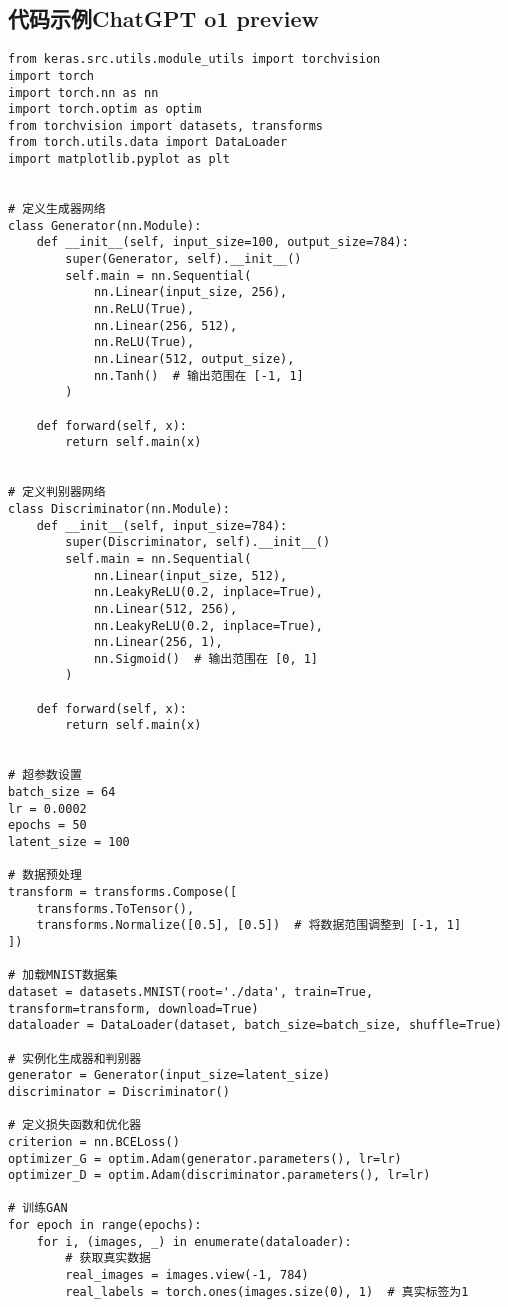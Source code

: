 \subsection*{代码示例ChatGPT o1 preview}
\begin{lstlisting}
from keras.src.utils.module_utils import torchvision
import torch
import torch.nn as nn
import torch.optim as optim
from torchvision import datasets, transforms
from torch.utils.data import DataLoader
import matplotlib.pyplot as plt


# 定义生成器网络
class Generator(nn.Module):
    def __init__(self, input_size=100, output_size=784):
        super(Generator, self).__init__()
        self.main = nn.Sequential(
            nn.Linear(input_size, 256),
            nn.ReLU(True),
            nn.Linear(256, 512),
            nn.ReLU(True),
            nn.Linear(512, output_size),
            nn.Tanh()  # 输出范围在 [-1, 1]
        )

    def forward(self, x):
        return self.main(x)


# 定义判别器网络
class Discriminator(nn.Module):
    def __init__(self, input_size=784):
        super(Discriminator, self).__init__()
        self.main = nn.Sequential(
            nn.Linear(input_size, 512),
            nn.LeakyReLU(0.2, inplace=True),
            nn.Linear(512, 256),
            nn.LeakyReLU(0.2, inplace=True),
            nn.Linear(256, 1),
            nn.Sigmoid()  # 输出范围在 [0, 1]
        )

    def forward(self, x):
        return self.main(x)


# 超参数设置
batch_size = 64
lr = 0.0002
epochs = 50
latent_size = 100

# 数据预处理
transform = transforms.Compose([
    transforms.ToTensor(),
    transforms.Normalize([0.5], [0.5])  # 将数据范围调整到 [-1, 1]
])

# 加载MNIST数据集
dataset = datasets.MNIST(root='./data', train=True, transform=transform, download=True)
dataloader = DataLoader(dataset, batch_size=batch_size, shuffle=True)

# 实例化生成器和判别器
generator = Generator(input_size=latent_size)
discriminator = Discriminator()

# 定义损失函数和优化器
criterion = nn.BCELoss()
optimizer_G = optim.Adam(generator.parameters(), lr=lr)
optimizer_D = optim.Adam(discriminator.parameters(), lr=lr)

# 训练GAN
for epoch in range(epochs):
    for i, (images, _) in enumerate(dataloader):
        # 获取真实数据
        real_images = images.view(-1, 784)
        real_labels = torch.ones(images.size(0), 1)  # 真实标签为1


\end{lstlisting}
